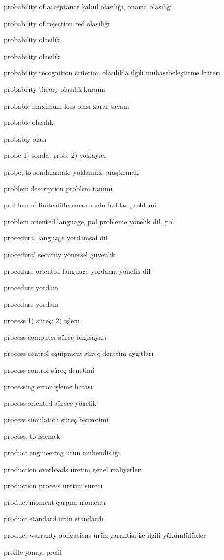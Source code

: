 \documentclass[12pt,fleqn]{article}\usepackage{../../common}
\begin{document}
probability of acceptance kabul olasılığı, onama olasılığı

probability of rejection red olasılığı

probability olasilik

probability olasılık

probability recognition criterion olasılıkla ilgili muhasebeleştirme kriteri

probability theory olasılık kuramı

probable maximum loss olası zarar tavanı

probable olasılık

probably olası

probe 1) sonda, prob; 2) yoklayıcı

probe, to sondalamak, yoklamak, araştırmak

problem description problem tanımı

problem of finite differences sonlu farklar problemi

problem oriented language, pol probleme yönelik dil, pol

procedural language yordamsal dil

procedural security yönetsel güvenlik

procedure oriented language yordama yönelik dil

procedure yordam

procedure yordam

process 1) süreç; 2) işlem

process computer süreç bilgisayarı

process control equipment süreç denetim aygıtları

process control süreç denetimi

processing error işleme hatası

process oriented sürece yönelik

process simulation süreç benzetimi

process, to işlemek

product engineering ürün mühendisliği

production overheads üretim genel maliyetleri

production process üretim süreci

product moment çarpım momenti

product standard ürün standardı

product warranty obligations ürün garantisi ile ilgili yükümlülükler

profile yanay, profil
\end{document}
